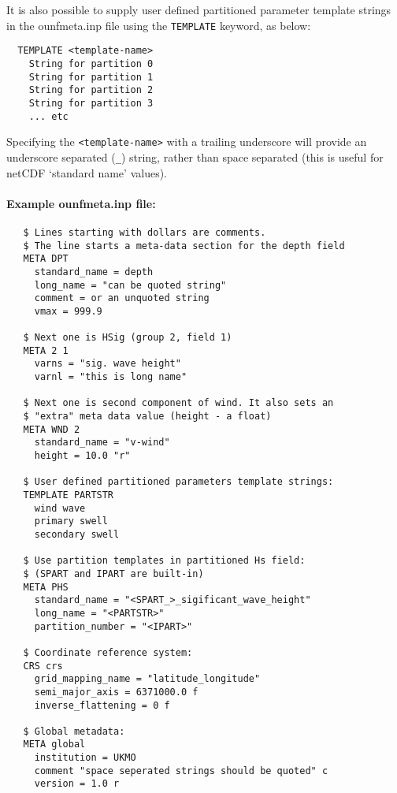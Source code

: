 \noindent
It is also possible to supply user defined partitioned parameter
template strings in the ounfmeta.inp file using the \texttt{TEMPLATE}
keyword, as below:

\begin{verbatim}
  TEMPLATE <template-name>
    String for partition 0
    String for partition 1
    String for partition 2
    String for partition 3
    ... etc
\end{verbatim}

\noindent
Specifying the \texttt{<template-name>} with a trailing underscore will
provide an underscore separated (\texttt{\_}) string, rather than space
separated (this is useful for netCDF `standard name' values).


\noindent
\paragraph{Example ounfmeta.inp file:}
\begin{verbatim}
   $ Lines starting with dollars are comments.
   $ The line starts a meta-data section for the depth field
   META DPT
     standard_name = depth
     long_name = "can be quoted string"
     comment = or an unquoted string
     vmax = 999.9

   $ Next one is HSig (group 2, field 1)
   META 2 1
     varns = "sig. wave height"
     varnl = "this is long name"

   $ Next one is second component of wind. It also sets an
   $ "extra" meta data value (height - a float)
   META WND 2
     standard_name = "v-wind"
     height = 10.0 "r"

   $ User defined partitioned parameters template strings:
   TEMPLATE PARTSTR
     wind wave
     primary swell
     secondary swell

   $ Use partition templates in partitioned Hs field:
   $ (SPART and IPART are built-in)
   META PHS
     standard_name = "<SPART_>_sigificant_wave_height"
     long_name = "<PARTSTR>"
     partition_number = "<IPART>"

   $ Coordinate reference system:
   CRS crs
     grid_mapping_name = "latitude_longitude"
     semi_major_axis = 6371000.0 f
     inverse_flattening = 0 f

   $ Global metadata:
   META global
     institution = UKMO
     comment "space seperated strings should be quoted" c
     version = 1.0 r

\end{verbatim}

\pb
